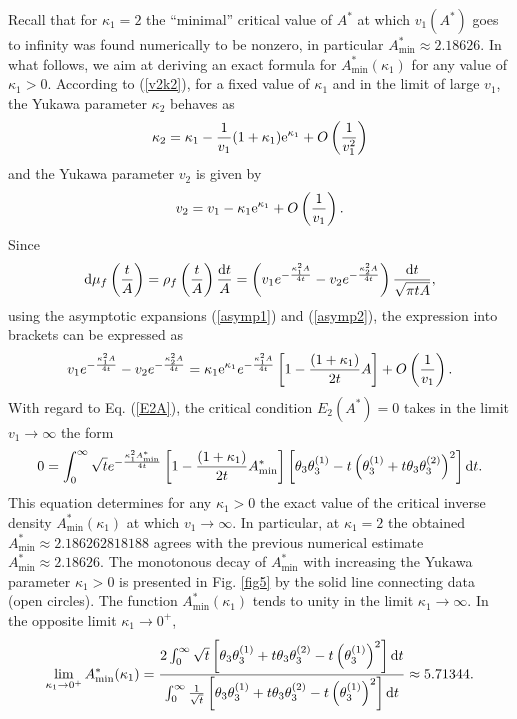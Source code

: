 \documentclass[12pt]{interact}
\theoremstyle{definition}
\begin{document}
Recall that for $\kappa_1=2$ the ``minimal'' critical value of $A^*$ at which
$v_1(A^*)$ goes to infinity was found numerically to be nonzero, in particular
$A^*_{\min}\approx 2.18626$.
In what follows, we aim at deriving an exact formula for
$A^*_{\min}(\kappa_1)$ for any value of $\kappa_1>0$.
According to (\ref{v2k2}), for a fixed value of $\kappa_1$ and in the limit
of large $v_1$, the Yukawa parameter $\kappa_2$ behaves as
\begin{equation} \label{asymp1}
\kappa_2 = \kappa_1 - \frac{1}{v_1} (1+\kappa_1) {\rm e}^{\kappa_1}
+ O\left( \frac{1}{v_1^2} \right)   
\end{equation}
and the Yukawa parameter $v_2$ is given by 
\begin{equation} \label{asymp2}
v_2 = v_1 - \kappa_1 {\rm e}^{\kappa_1} + O\left( \frac{1}{v_1} \right) .    
\end{equation}
Since
\begin{equation}
{\rm d}\mu_f\left(\frac{t}{A} \right) = \rho_f\left(\frac{t}{A} \right) \frac{{\rm d}t}{A}
= \left( v_1 e^{-\frac{\kappa_1^2 A}{4t}}
-v_2 e^{-\frac{\kappa_2^2 A}{4t}}\right) \frac{{\rm d}t}{\sqrt{\pi t A}} ,
\end{equation}
using the asymptotic expansions (\ref{asymp1}) and (\ref{asymp2}),
the expression into brackets can be expressed as  
\begin{equation}
v_1 e^{-\frac{\kappa_1^2 A}{4t}} -v_2 e^{-\frac{\kappa_2^2 A}{4t}}
= \kappa_1 {\rm e}^{\kappa_1} e^{-\frac{\kappa_1^2 A}{4t}}
\left[ 1 - \frac{(1+\kappa_1)}{2 t} A \right] +
O\left( \frac{1}{v_1} \right) .
\end{equation}  
With regard to Eq. (\ref{E2A}), the critical condition $E_2(A^*)=0$
takes in the limit $v_1\to\infty$ the form
\begin{equation} 
0 = \int_0^\infty \sqrt{t} e^{-\frac{\kappa_1^2 A^*_{\min}}{4t}}
\left[ 1 - \frac{(1+\kappa_1)}{2 t} A^*_{\min} \right]
\left[ \theta_3 \theta_3^{(1)} - t \left( \theta_3^{(1)}
+ t\theta_3 \theta_3^{(2)} \right)^2 \right] {\rm d}t .
\end{equation}
This equation determines for any $\kappa_1>0$ the exact value of
the critical inverse density $A^*_{\min}(\kappa_1)$ at which $v_1\to\infty$.
In particular, at $\kappa_1=2$ the obtained $A^*_{\min}\approx 2.186262818188$
agrees with the previous numerical estimate $A^*_{\min}\approx 2.18626$.
The monotonous decay of $A^*_{\min}$ with increasing the Yukawa parameter
$\kappa_1>0$ is presented in Fig. \ref{fig5} by the solid line
connecting data (open circles).
The function $A^*_{\min}(\kappa_1)$ tends to unity in the limit
$\kappa_1\to\infty$.
In the opposite limit $\kappa_1\to 0^+$,
\begin{equation} 
\lim_{\kappa_1\to 0^+} A^*_{\min}(\kappa_1) =
\frac{ 2 \int_0^\infty  \sqrt{t}
\left[ \theta_3 \theta_3^{(1)} + t\theta_3 \theta_3^{(2)}
- t \left( \theta_3^{(1)} \right)^2 \right]{\rm d}t}{\int_0^\infty 
\frac{1}{\sqrt{t}}
\left[ \theta_3 \theta_3^{(1)} + t\theta_3 \theta_3^{(2)}
- t \left( \theta_3^{(1)} \right)^2 \right]{\rm d}t}\approx 5.71344 .
\end{equation}  
\end{document}
